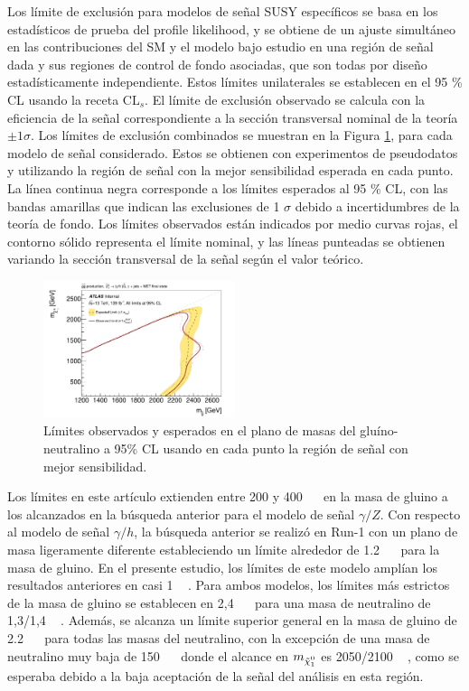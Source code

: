 Los límite de exclusión para modelos de señal SUSY específicos se basa en los estadísticos de prueba del profile likelihood, y se obtiene de un ajuste simultáneo en las contribuciones del SM y el modelo bajo estudio en una región de señal dada y sus regiones de control de fondo asociadas, que son todas por diseño estadísticamente independiente. Estos límites unilaterales se establecen en el 95 \% CL usando la receta $\mathrm{CL}_s$.
El límite de exclusión observado se calcula con la eficiencia de la señal correspondiente a la sección transversal nominal de la teoría $\pm 1 \sigma$. Los límites de exclusión combinados se muestran en la Figura \ref{fig:limit_plot_combined}, para cada modelo de señal considerado. Estos se obtienen con experimentos de pseudodatos y utilizando la región de señal con la mejor sensibilidad esperada en cada punto.
La línea continua negra corresponde a los límites esperados al 95 \% CL, con las
bandas amarillas que indican las exclusiones de 1 $\sigma$ debido a
incertidumbres de la teoría de fondo. Los límites observados están indicados por medio
curvas rojas, el contorno sólido representa el límite nominal, y las líneas punteadas se obtienen variando la sección transversal de la señal según el valor teórico.

\begin{figure}[ht!]
  \centering
  \includegraphics[width=0.5\textwidth]{images_tmp/contour_plot_gH_BestSR.pdf}
  \caption{Límites observados y esperados en el plano de masas del gluíno-neutralino a 95\% CL usando en cada punto la región de señal con mejor sensibilidad.}
  \label{fig:limit_plot_combined}
\end{figure}

Los límites en este artículo extienden entre 200 y 400 ~ \gev\ en la masa de gluino a los alcanzados en la búsqueda anterior \cite{SUSY-2016-27} para el modelo de señal $\gamma/Z$. Con respecto al modelo de señal $\gamma/h$, la búsqueda anterior \cite{SUSY-2014-01} se realizó en Run-1 con un plano de masa ligeramente diferente estableciendo un límite alrededor de 1.2 ~ \tev\ para la masa de gluino. En el presente estudio, los límites de este modelo amplían los resultados anteriores en casi 1 ~ \tev.
Para ambos modelos, los límites más estrictos de la masa de gluino se establecen en 2,4 ~ \tev\ para una masa de neutralino de 1,3/1,4 ~ \tev. Además, se alcanza un límite superior general en la masa de gluino de 2.2 ~ \tev \, para todas las masas del neutralino, con la excepción de una masa de neutralino muy baja de 150 ~ \gev\ donde el alcance en $m_{\ninoone}$ es 2050/2100 ~ \gev, como se esperaba debido a la baja aceptación de la señal del análisis en esta región.


